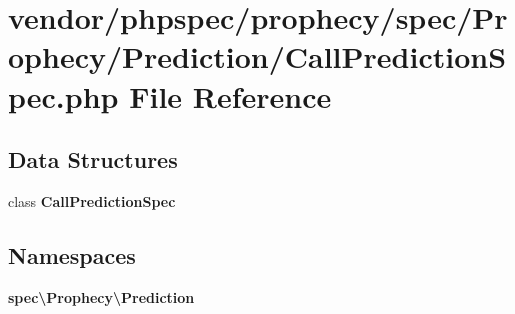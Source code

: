 \section{vendor/phpspec/prophecy/spec/\+Prophecy/\+Prediction/\+Call\+Prediction\+Spec.php File Reference}
\label{_call_prediction_spec_8php}
\subsection*{Data Structures}
\begin{DoxyCompactItemize}
\item 
class {\bf Call\+Prediction\+Spec}
\end{DoxyCompactItemize}
\subsection*{Namespaces}
\begin{DoxyCompactItemize}
\item 
 {\bf spec\textbackslash{}\+Prophecy\textbackslash{}\+Prediction}
\end{DoxyCompactItemize}

